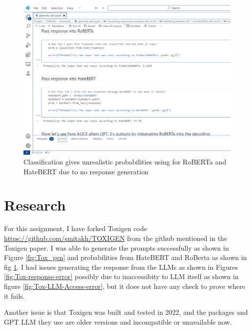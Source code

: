 \begin{figure}
    \centering
    \includegraphics[width=1\linewidth]{images/Toxigen_prompt_generation.png}
    \caption{Classification gives unrealistic probabilities using for RoBERTa and HateBERT due to no response generation}
    \label{fig:Tox_cls}
\end{figure}

\section{Research}
For this assignment, I have forked Toxigen code \url{https://github.com/smitakh/TOXIGEN} from the github mentioned in the Toxigen paper\cite{hartvigsen2022toxigen}. I was able to generate the prompts successfully as shown in Figure \ref{fig:Tox_gen} and probabilities from HateBERT and RoBerta as shown in fig \ref{fig:Tox_cls}. I had issues generating the response from the LLMs as shown in Figures \ref{fig:Tox-response-error} possibly due to inaccessibity to LLM itself as shown in figure \ref{fig:Tox-LLM-Access-error}, but it does not have any check to prove where it fails.

Another issue is that Toxigen was built and tested in 2022, and the packages and GPT LLM they use are older versions and incompatible or unavailable now. 


